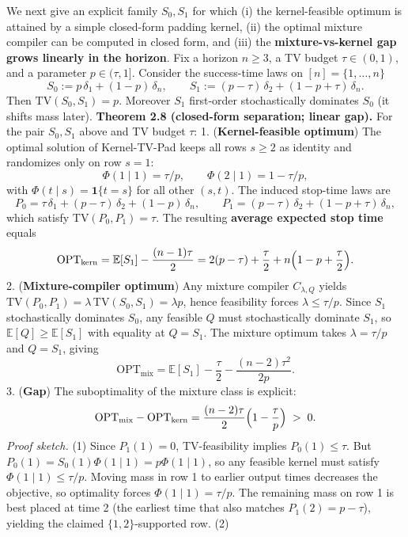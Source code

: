 \documentclass[11pt]{article}
\begin{document}
We next give an explicit family \(S_0,S_1\) for which (i) the
kernel-feasible optimum is attained by a simple closed-form padding
kernel, (ii) the optimal mixture compiler can be computed in closed
form, and (iii) the \textbf{mixture-vs-kernel gap grows linearly in the
horizon}. Fix a horizon \(n\ge 3\), a TV budget \(\tau\in(0,1)\), and a
parameter \(p\in(\tau,1]\). Consider the success-time laws on
\([n]=\{1,\dots,n\}\) \[
S_0:= p\,\delta_1 + (1-p)\,\delta_n,\qquad
S_1:= (p-\tau)\,\delta_2 + (1-p+\tau)\,\delta_n.
\] Then \(\mathrm{TV}(S_0,S_1)=p\). Moreover \(S_1\) first-order
stochastically dominates \(S_0\) (it shifts mass later). \textbf{Theorem
2.8 (closed-form separation; linear gap).} For the pair \(S_0,S_1\)
above and TV budget \(\tau\): 1. (\textbf{Kernel-feasible optimum}) The
optimal solution of Kernel-TV-Pad keeps all rows \(s\ge 2\) as identity
and randomizes only on row \(s=1\): \[
 \Phi(1\mid 1)=\tau/p,\qquad \Phi(2\mid 1)=1-\tau/p,
 \] with \(\Phi(t\mid s)=\mathbf{1}\{t=s\}\) for all other \((s,t)\).
The induced stop-time laws are \[
 P_0=\tau\,\delta_1+(p-\tau)\,\delta_2+(1-p)\,\delta_n,\qquad
 P_1=(p-\tau)\,\delta_2+(1-p+\tau)\,\delta_n,
 \] which satisfy \(\mathrm{TV}(P_0,P_1)=\tau\). The resulting
\textbf{average expected stop time} equals \[
 \mathrm{OPT}_{\mathrm{kern}} = \mathbb{E}[S_1] - \frac{(n-1)\tau}{2}
 = 2(p-\tau)+\frac{\tau}{2} + n\Bigl(1-p+\frac{\tau}{2}\Bigr).
 \] 2. (\textbf{Mixture-compiler optimum}) Any mixture compiler
\(C_{\lambda,Q}\) yields
\(\mathrm{TV}(P_0,P_1)=\lambda\,\mathrm{TV}(S_0,S_1)=\lambda p\), hence
feasibility forces \(\lambda\le \tau/p\). Since \(S_1\) stochastically
dominates \(S_0\), any feasible \(Q\) must stochastically dominate
\(S_1\), so \(\mathbb{E}[Q]\ge \mathbb{E}[S_1]\) with equality at
\(Q=S_1\). The mixture optimum takes \(\lambda=\tau/p\) and \(Q=S_1\),
giving \[
 \mathrm{OPT}_{\mathrm{mix}} = \mathbb{E}[S_1] - \frac{\tau}{2} - \frac{(n-2)\tau^2}{2p}.
 \] 3. (\textbf{Gap}) The suboptimality of the mixture class is
explicit: \[
 \mathrm{OPT}_{\mathrm{mix}}-\mathrm{OPT}_{\mathrm{kern}}
 = \frac{(n-2)\tau}{2}\Bigl(1-\frac{\tau}{p}\Bigr)
 \;>\;0.
 \] \emph{Proof sketch.} (1) Since \(P_1(1)=0\), TV-feasibility implies
\(P_0(1)\le \tau\). But \(P_0(1)=S_0(1)\Phi(1\mid 1)=p\Phi(1\mid 1)\),
so any feasible kernel must satisfy \(\Phi(1\mid 1)\le \tau/p\). Moving
mass in row 1 to earlier output times decreases the objective, so
optimality forces \(\Phi(1\mid 1)=\tau/p\). The remaining mass on row 1
is best placed at time 2 (the earliest time that also matches
\(P_1(2)=p-\tau\)), yielding the claimed \(\{1,2\}\)-supported row. (2)
\end{document}
